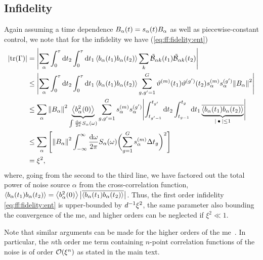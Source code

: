 \subsection{Infidelity}\label{subsec:app:ff:convergence:infidelity}
Again assuming a time dependence $B_\alpha(t) = s_\alpha(t)B_\alpha$ as well as piecewise-constant control, we note that for the infidelity we have (\cf \cref{eq:ff:fidelity:ent})
\begin{align}
    \abs{\tr(\decayamps)} &= \abs\Bigg{\sum_{\alpha}\int_0^\tau\dd{t_2}\int_0^\tau\dd{t_1}
                             \expval{b_\alpha(t_1)b_\alpha(t_2)}\sum_{k}\ctrlmat_{\alpha k}(t_1)\ctrlmat_{\alpha k}(t_2)} \notag\\
                          &\leq\abs\Bigg{\sum_{\alpha}\int_0^\tau\dd{t_2}\int_0^\tau\dd{t_1}
                             \expval{b_\alpha(t_1)b_\alpha(t_2)}\sum_{g,g^\prime=1}^{G}\vartheta\gth{m}(t_1)\vartheta^{(g^\prime)}(t_2)
                             s_\alpha\gth{m} s_\alpha^{(g^\prime)} \norm{B_\alpha}^2} \notag\\
                          &\leq\sum_{\alpha}\norm{B_\alpha}^2
                             \underbrace{\expval{b_\alpha^2(0)}}_{\int\frac{\dd{\omega}}{2\pi}S_\alpha(\omega)}
                             \sum_{g,g^\prime=1}^{G} s_\alpha\gth{m} s_\alpha^{(g^\prime)}
                             \abs\Bigg{\int_{t_{g^\prime-1}}^{t_{g^\prime}}\dd{t_2}\int_{t_{g-1}}^{t_g}\dd{t_1}
                             \underbrace{\overline{\expval{b_\alpha(t_1)b_\alpha(t_2)}}}_{\abs{\placeholder}\leq 1}} \notag\\
                          &\leq\sum_{\alpha}\left[\norm{B_\alpha}^2
                             \int_{-\infty}^\infty\frac{\mathrm{d}\omega}{2\pi}S_\alpha(\omega)
                             \biggl(\sum_{g=1}^{G}s_\alpha\gth{m}\Delta t_g\biggr)^2\right] \notag\\
                          &= \xi^2,
\end{align}
where, going from the second to the third line, we have factored out the total power of noise source $\alpha$ from the cross-correlation function, $\expval{b_\alpha(t_1) b_\alpha(t_2)} = \expval{b_\alpha^2(0)}\bigl\lvert\overline{\expval{b_\alpha(t_1)b_\alpha(t_2)}}\bigr\rvert$.
Thus, the first order infidelity \cref{eq:ff:fidelity:ent} is upper-bounded by $d^{-1}\xi^2$, the same parameter also bounding the convergence of the \gls{me}, and higher orders can be neglected if $\xi^2\ll 1$.

Note that similar arguments can be made for the higher orders of the \gls{me}~\cite{Green2013}.
In particular, the $n$th order \gls{me} term containing $n$-point correlation functions of the noise is of order $\order{\xi^n}$ as stated in the main text.


